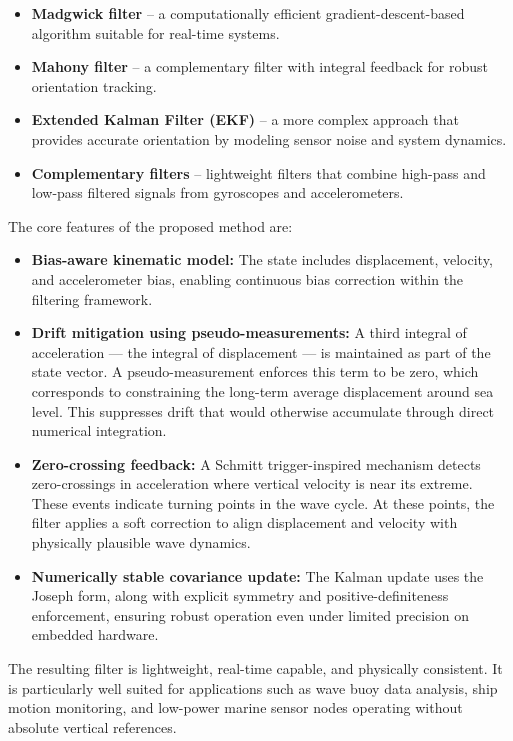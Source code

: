 \documentclass[11pt,letterpaper]{article}
\begin{document}
\begin{itemize}
\item \textbf{Madgwick filter} – a computationally efficient gradient-descent-based algorithm suitable for real-time systems.
\item \textbf{Mahony filter} – a complementary filter with integral feedback for robust orientation tracking.
\item \textbf{Extended Kalman Filter (EKF)} – a more complex approach that provides accurate orientation by modeling sensor noise and system dynamics.
\item \textbf{Complementary filters} – lightweight filters that combine high-pass and low-pass filtered signals from gyroscopes and accelerometers.
\end{itemize}

The core features of the proposed method are:

\begin{itemize}
    \item \textbf{Bias-aware kinematic model:} The state includes displacement, velocity, and accelerometer bias, enabling continuous bias correction within the filtering framework.
    
    \item \textbf{Drift mitigation using pseudo-measurements:} A third integral of acceleration --- the integral of displacement --- is maintained as part of the state vector. A pseudo-measurement enforces this term to be zero, which corresponds to constraining the long-term average displacement around sea level. This suppresses drift that would otherwise accumulate through direct numerical integration.
    
    \item \textbf{Zero-crossing feedback:} A Schmitt trigger-inspired mechanism detects zero-crossings in acceleration where vertical velocity is near its extreme. These events indicate turning points in the wave cycle. At these points, the filter applies a soft correction to align displacement and velocity with physically plausible wave dynamics.
    
    \item \textbf{Numerically stable covariance update:} The Kalman update uses the Joseph form, along with explicit symmetry and positive-definiteness enforcement, ensuring robust operation even under limited precision on embedded hardware.
\end{itemize}

The resulting filter is lightweight, real-time capable, and physically consistent. It is particularly well suited for applications such as wave buoy data analysis, ship motion monitoring, and low-power marine sensor nodes operating without absolute vertical references.
\end{document}
